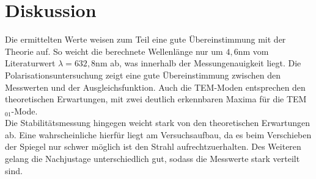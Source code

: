 \section{Diskussion}
Die ermittelten Werte weisen zum Teil eine gute Übereinstimmung mit der Theorie auf. So weicht die berechnete Wellenlänge nur um $4,6 \si{\nano\meter}$ vom Literaturwert
$\lambda=632,8 \si{\nano\meter}$ \cite{anleitung} ab, was innerhalb der Messungenauigkeit liegt. Die Polarisationsuntersuchung zeigt eine gute Übereinstimmung zwischen
den Messwerten und der Ausgleichsfunktion. Auch die TEM-Moden entsprechen den theoretischen Erwartungen, mit zwei deutlich erkennbaren Maxima für die TEM$_{01}$-Mode.\\
Die Stabilitätsmessung hingegen weicht stark von den theoretischen Erwartungen ab. Eine wahrscheinliche hierfür
liegt am Versuchsaufbau, da es beim Verschieben der Spiegel nur schwer möglich ist den Strahl aufrechtzuerhalten. Des Weiteren gelang die Nachjustage unterschiedlich gut,
sodass die Messwerte stark verteilt sind.
